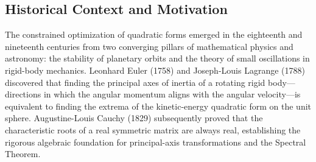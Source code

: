 \documentclass[11pt, letterpaper]{article}
\theoremstyle{definition}
\theoremstyle{remark}
\begin{document}
\begin{center}
\end{center}

\subsection{Historical Context and Motivation}
The constrained optimization of quadratic forms emerged in the eighteenth and nineteenth centuries from two converging pillars of mathematical physics and astronomy: the stability of planetary orbits and the theory of small oscillations in rigid-body mechanics. Leonhard Euler (1758) and Joseph-Louis Lagrange (1788) discovered that finding the principal axes of inertia of a rotating rigid body—directions in which the angular momentum aligns with the angular velocity—is equivalent to finding the extrema of the kinetic-energy quadratic form on the unit sphere. Augustine-Louis Cauchy (1829) subsequently proved that the characteristic roots of a real symmetric matrix are always real, establishing the rigorous algebraic foundation for principal-axis transformations and the Spectral Theorem.
\end{document}
